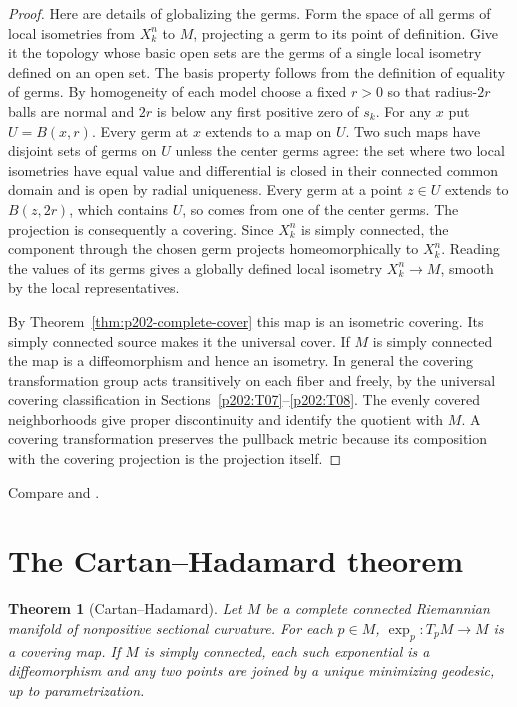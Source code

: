 \documentclass[11pt,oneside,openany]{book}
\theoremstyle{plain}
\newtheorem{theorem}{Theorem}[chapter]
\theoremstyle{definition}
\theoremstyle{remark}
\begin{document}
\begin{proof}
Here are details of globalizing the germs. Form the space
of all germs of local isometries from \(X_k^n\) to \(M\),
projecting a germ to its point of definition. Give it the
topology whose basic open sets are the germs of a single
local isometry defined on an open set. The basis property
follows from the definition of equality of germs.
By homogeneity of each model choose a fixed \(r>0\) so that
radius-\(2r\) balls are normal and \(2r\) is below any first
positive zero of \(s_k\). For any \(x\) put \(U=B(x,r)\).
Every germ at \(x\) extends to a map on \(U\).
Two such maps have disjoint sets of germs on \(U\) unless
the center germs agree: the set where two local isometries
have equal value and differential is closed in their
connected common domain and is open by radial uniqueness.
Every germ at a point \(z\in U\) extends to \(B(z,2r)\),
which contains \(U\), so comes from one of the center germs.
The projection is consequently a covering. Since \(X_k^n\)
is simply connected, the component through the chosen germ
projects homeomorphically to \(X_k^n\).
Reading the values of its germs gives a globally defined
local isometry \(X_k^n\to M\), smooth by the local
representatives.

By Theorem~\ref{thm:p202-complete-cover} this map is an
isometric covering. Its simply connected source makes it
the universal cover. If \(M\) is simply connected the map
is a diffeomorphism and hence an isometry. In general the
covering transformation group acts transitively on each
fiber and freely, by the universal covering classification
in Sections~\ref{p202:T07}--\ref{p202:T08}. The evenly covered
neighborhoods give proper discontinuity and identify the
quotient with \(M\). A covering transformation preserves
the pullback metric because its composition with the
covering projection is the projection itself.
\end{proof}

Compare \cite[Chapter 12, Theorem 12.4]{LeeRM}
and \cite[Chapters 7--8]{dC}.

\section{The Cartan--Hadamard theorem}
\label{p202:G23}

\begin{theorem}[Cartan--Hadamard]\label{thm:p202-cartan-hadamard}
Let \(M\) be a complete connected Riemannian manifold of
nonpositive sectional curvature. For each \(p\in M\),
\(\exp_p:T_pM\to M\) is a covering map. If \(M\) is simply
connected, each such exponential is a diffeomorphism and
any two points are joined by a unique minimizing geodesic,
up to parametrization.
\end{theorem}
\end{document}

